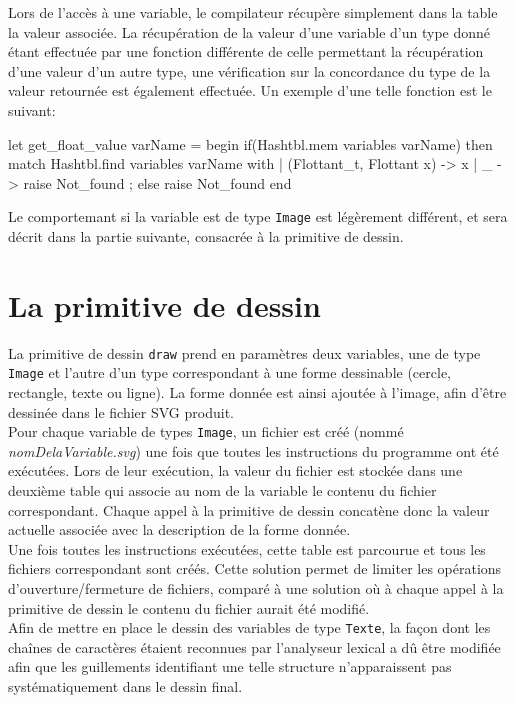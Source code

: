 \documentclass[a4paper, 12pt]{report}
\begin{document}
	Lors de l'accès à une variable, le compilateur récupère simplement dans la table la valeur associée. La récupération de la valeur d'une variable d'un type donné étant effectuée par une fonction différente de celle permettant la récupération d'une valeur d'un autre type, une vérification sur la concordance du type de la valeur retournée est également effectuée. Un exemple d'une telle fonction est le suivant:
	
\begin{verbatimtab}[4]
	let get_float_value varName =
	begin
		if(Hashtbl.mem variables varName)
		then
			match Hashtbl.find variables varName with
				|	(Flottant_t, Flottant x)	->	x
				|	_				->	raise Not_found
				;
		else
				raise Not_found
	end
\end{verbatimtab}

	Le comportemant si la variable est de type \texttt{Image} est légèrement différent, et sera décrit dans la partie suivante, consacrée à la primitive de dessin.

	\section{La primitive de dessin}
	
	La primitive de dessin \texttt{draw} prend en paramètres deux variables, une de type \texttt{Image} et l'autre d'un type correspondant à une forme dessinable (cercle, rectangle, texte ou ligne). La forme donnée est ainsi ajoutée à l'image, afin d'être dessinée dans le fichier SVG produit.\\
	
	Pour chaque variable de types \texttt{Image}, un fichier est créé (nommé \textit{nomDelaVariable.svg}) une fois que toutes les instructions du programme ont été exécutées. Lors de leur exécution, la valeur du fichier est stockée dans une deuxième table qui associe au nom de la variable le contenu du fichier correspondant. Chaque appel à la primitive de dessin concatène donc la valeur actuelle associée avec la description de la forme donnée.\\
	
	Une fois toutes les instructions exécutées, cette table est parcourue et tous les fichiers correspondant sont créés. Cette solution permet de limiter les opérations d'ouverture/fermeture de fichiers, comparé à une solution où à chaque appel à la primitive de dessin le contenu du fichier aurait été modifié.\\
	
	Afin de mettre en place le dessin des variables de type \texttt{Texte}, la façon dont les chaînes de caractères étaient reconnues par l'analyseur lexical a dû être modifiée afin que les guillements identifiant une telle structure n'apparaissent pas systématiquement dans le dessin final.
\end{document}
